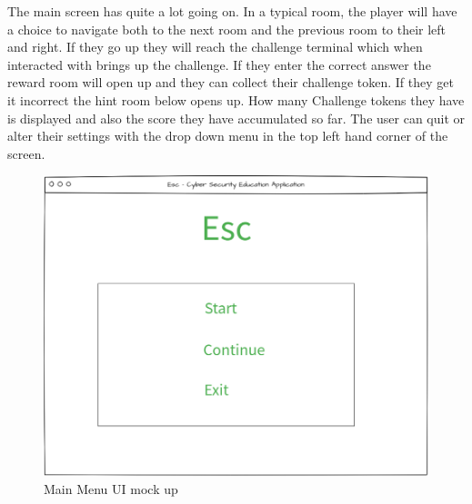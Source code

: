 \documentclass[12pt,a4paper]{article}
\begin{document}
The main screen has quite a lot going on. In a typical room, the player will have a choice to navigate both to the next room and the previous room to their left and right. If they go up they will reach the challenge terminal which when interacted with brings up the challenge. If they enter the correct answer the reward room will open up and they can collect their challenge token. If they get it incorrect the hint room below opens up. How many Challenge tokens they have is displayed and also the score they have accumulated so far. The user can quit or alter their settings with the drop down menu in the top left hand corner of the screen.

\begin{figure}[h]
    \centering
    \includegraphics[width=1.0\textwidth]{Figs/Ui_main_menu.PNG} 
    \caption{Main Menu UI mock up}
\end{figure}   
\end{document}
